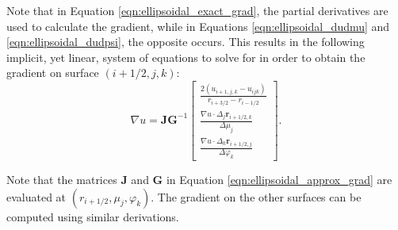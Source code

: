 Note that in Equation \ref{eqn:ellipsoidal_exact_grad}, the partial derivatives are used to calculate the gradient, while in Equations \ref{eqn:ellipsoidal_dudmu} and \ref{eqn:ellipsoidal_dudpsi}, the opposite occurs.
This results in the following implicit, yet linear, system of equations to solve for in order to obtain the gradient on surface $(i+1/2,j,k)$:
\begin{equation}
    \nabla u = \mathbf{J} \mathbf{G}^{-1}
    \begin{bmatrix}
        \displaystyle \frac{ 2(u_{i+1,j,k} - u_{ijk}) }{r_{i+3/2} - r_{i-1/2}} \\
        \displaystyle \frac{ \nabla u \cdot \Delta_j \mathbf{r}_{i+1/2,k} }{\Delta \mu_j} \\
        \displaystyle \frac{ \nabla u \cdot \Delta_k \mathbf{r}_{i+1/2,j} }{\Delta \varphi_k}
    \end{bmatrix}.
    \label{eqn:ellipsoidal_approx_grad}
\end{equation}

Note that the matrices $\mathbf{J}$ and $\mathbf{G}$ in Equation \ref{eqn:ellipsoidal_approx_grad} are evaluated at $(r_{i+1/2}, \mu_j, \varphi_k)$. The gradient on the other surfaces can be computed using similar derivations.